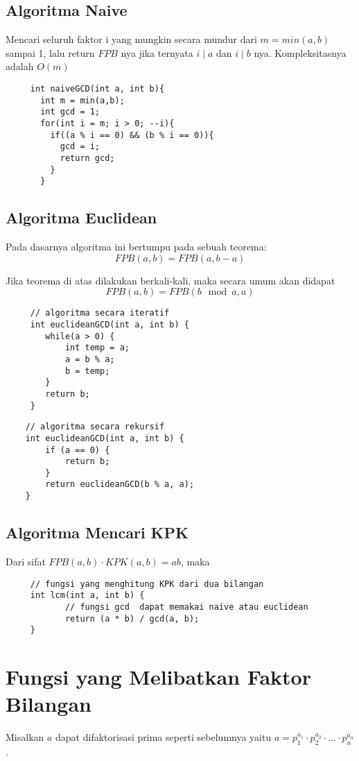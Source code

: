 	 \subsection{Algoritma Naive}
	 Mencari seluruh faktor i yang mungkin secara mundur dari $m = min(a,b)$ sampai 1, lalu return $FPB$ nya jika ternyata $i \mid a$ dan $i \mid b$ nya. Kompleksitasnya adalah $O(m)$
	 
	 \begin{lstlisting}
	 int naiveGCD(int a, int b){
	   int m = min(a,b);
	   int gcd = 1;
	   for(int i = m; i > 0; --i){
	     if((a % i == 0) && (b % i == 0)){
	       gcd = i;
	       return gcd;
	     }
	   }
	 \end{lstlisting}
	 
	 
	 \subsection{Algoritma Euclidean}
	 Pada dasarnya algoritma ini bertumpu pada sebuah teorema:
	 $$FPB(a,b) = FPB(a,b-a)$$
	 
	 Jika teorema di atas dilakukan berkali-kali, maka secara umum akan didapat
	 $$FPB(a,b) = FPB(b\mod a , a)$$
	 
	 \begin{lstlisting}
	 // algoritma secara iteratif
	 int euclideanGCD(int a, int b) {
	   	while(a > 0) {
	   		int temp = a;
	   		a = b % a;
	   		b = temp;
	 	}
	 	return b;
	 }
	 \end{lstlisting}
	
	\begin{lstlisting}
	// algoritma secara rekursif
	int euclideanGCD(int a, int b) {
	    if (a == 0) {
	        return b;
	    }
	    return euclideanGCD(b % a, a);
	}
	\end{lstlisting}
	
	\subsection{Algoritma Mencari KPK}
	Dari sifat $FPB(a,b) \cdot KPK(a,b) = ab$, maka
	 \begin{lstlisting}
	 // fungsi yang menghitung KPK dari dua bilangan
	 int lcm(int a, int b) {
		 	// fungsi gcd  dapat memakai naive atau euclidean
		 	return (a * b) / gcd(a, b); 
	 }
	 \end{lstlisting}
	 
	  \section{Fungsi yang Melibatkan Faktor Bilangan}
	     Misalkan $a$ dapat difaktorisasi prima seperti sebelumnya yaitu $a=p_1^{a_1}\cdot p_2^{a_2}\cdot \ldots \cdot p_n^{a_n}$.
